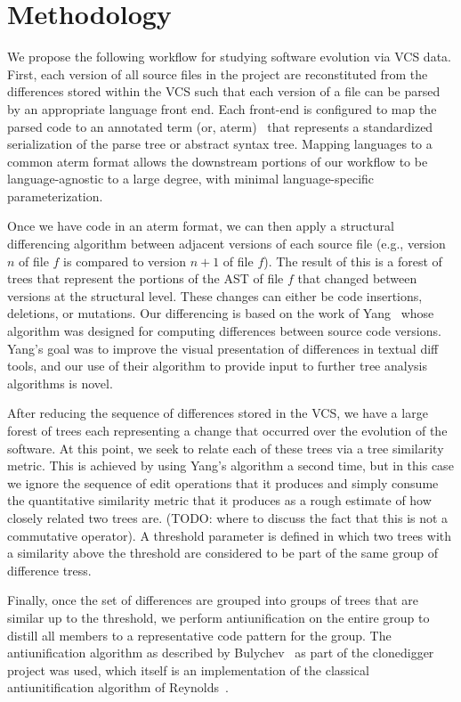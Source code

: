
\section{Methodology}

We propose the following workflow for studying software evolution via VCS
data.  First, each version of all source files in the project are
reconstituted from the differences stored within the VCS such that each
version of a file can be parsed by an appropriate language front end.  Each
front-end is configured to map the parsed code to an annotated term (or,
aterm)~\cite{brand00aterm} that represents a standardized serialization of the parse
tree or abstract syntax tree.  Mapping languages to a common aterm format allows
the downstream portions of our workflow to be language-agnostic to a large degree,
with minimal language-specific parameterization.  

Once we have code in an aterm format, we can then apply a structural
differencing algorithm between adjacent versions of each source file (e.g.,
version $n$ of file $f$ is compared to version $n+1$ of file $f$).  The result
of this is a forest of trees that represent the portions of the AST of file
$f$ that changed between versions at the structural level.  These changes can
either be code insertions, deletions, or mutations.  Our differencing is based
on the work of Yang~\cite{yang91diff} whose algorithm was designed for computing
differences between source code versions.  Yang's goal was to improve the
visual presentation of differences in textual diff tools, and our use of their
algorithm to provide input to further tree analysis algorithms is novel.

After reducing the sequence of differences stored in the VCS, we have a large
forest of trees each representing a change that occurred over the evolution of
the software.  At this point, we seek to relate each of these trees via a 
tree similarity metric.  This is achieved by using Yang's algorithm a second time,
but in this case we ignore the sequence of edit operations that it produces and
simply consume the quantitative similarity metric that it produces as a rough
estimate of how closely related two trees are.  (TODO: where to discuss the fact that
this is not a commutative operator).  A threshold parameter is defined in which
two trees with a similarity above the threshold are considered to be part of the same
group of difference tress.

Finally, once the set of differences are grouped into groups of trees that
are similar up to the threshold, we perform antiunification on the entire
group to distill all members to a representative code pattern for the
group.  The antiunification algorithm as described by
Bulychev~\cite{bulychev08dupe} as part of the clonedigger project
was used, which itself is an implementation of the classical antiunitification
algorithm of Reynolds~\cite{reynolds69antiunification}.

